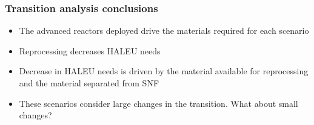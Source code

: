 \begin{frame}
    \frametitle{Transition analysis conclusions}
    \begin{itemize}
        \item The advanced reactors deployed drive the materials required 
              for each scenario
        \item Reprocessing decreases \gls{HALEU} needs 
        \item Decrease in \gls{HALEU} needs is driven by the material 
              available for reprocessing and the material separated 
              from \gls{SNF}
        \item<2-> These scenarios consider large changes in the transition. 
             What about small changes?
    \end{itemize}
\end{frame}